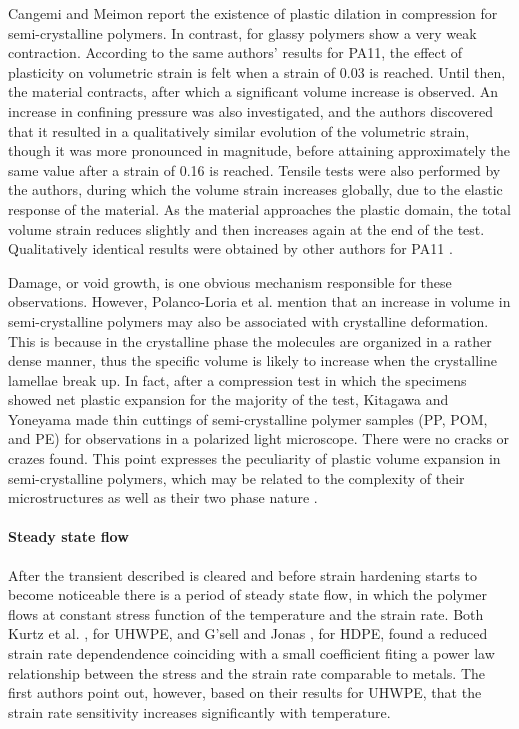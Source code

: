 Cangemi and Meimon \citep{cangemiTwoPhaseModelMechanical2001} report the existence of plastic dilation in compression for semi-crystalline polymers.
In contrast, for glassy polymers show a very weak contraction.
According to the same authors' results for PA11, the effect of plasticity on volumetric strain is felt when a strain of \num{0.03} is reached.
Until then, the material contracts, after which a significant volume increase is observed.
An increase in confining pressure was also investigated, and the authors discovered that it resulted in a qualitatively similar evolution of the volumetric strain, though it was more pronounced in magnitude, before attaining approximately the same value after a strain of \num{0.16} is reached.
Tensile tests were also performed by the authors, during which the volume strain increases globally, due to the elastic response of the material.
As the material approaches the plastic domain, the total volume strain reduces slightly and then increases again at the end of the test.
Qualitatively identical results were obtained by other authors for PA11 \citep{marchalInfluenceCheminChargement1996}.

Damage, or void growth, is one obvious mechanism responsible for these observations.
However, Polanco-Loria et al. \citep{polanco-loriaConstitutiveModelThermoplastics2010} mention that an increase in volume in semi-crystalline polymers may also be associated with crystalline deformation.
This is because in the crystalline phase the molecules are organized in a rather dense manner, thus the specific volume is likely to increase when the crystalline lamellae break up.
In fact, after a compression test in which the specimens showed net plastic expansion for the majority of the test, Kitagawa and Yoneyama \citep{kitagawaPlasticDilatationDue1988} made thin cuttings of semi-crystalline polymer samples (PP, POM, and PE) for observations in a polarized light microscope.
There were no cracks or crazes found.
This point expresses the peculiarity of plastic volume expansion in semi-crystalline polymers, which may be related to the complexity of their microstructures as well as their two phase nature \citep{cangemiTwoPhaseModelMechanical2001}.

\paragraph{Steady state flow}

After the transient described is cleared and before strain hardening starts to become noticeable there is a period of steady state flow, in which the polymer flows at constant stress function of the temperature and the strain rate.
Both Kurtz et al. \citep{kurtzThermomechanicalBehaviorVirgin2002}, for UHWPE, and G'sell and Jonas \citep{gsellDeterminationPlasticBehaviour1979}, for HDPE, found a reduced strain rate dependendence coinciding with a small coefficient fiting a power law relationship between the stress and the strain rate comparable to metals.
The first authors point out, however, based on their results for UHWPE, that the strain rate sensitivity increases significantly with temperature.

